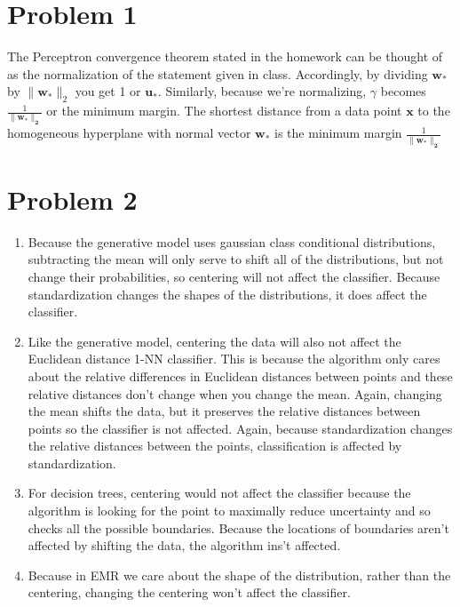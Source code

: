 \documentclass[twoside,11pt]{homework}
\begin{document}
\maketitle

\section*{Problem 1}
The Perceptron convergence theorem stated in the homework can be thought of as the normalization of the statement given in class. Accordingly, by dividing $\bm{w_*}$ by $\|\bm{w_*}\|_2$ you get 1 or $\bm{u_*}$.  Similarly, because we're normalizing, $\gamma$ becomes $\frac{1}{\bm{\|w_*\|_2}}$ or the minimum margin.  The shortest distance from a data point $\bm{x}$ to the homogeneous hyperplane with normal vector $\bm{w_*}$ is the minimum margin $\frac{1}{\bm{\|w_*\|_2}}$

\section*{Problem 2}

\begin{enumerate}[label=\Alph*]
\item Because the generative model uses gaussian class conditional distributions, subtracting the mean will only serve to shift all of the distributions, but not change their probabilities, so centering will not affect the classifier.  Because standardization changes the shapes of the distributions, it does affect the classifier.
\item Like the generative model, centering the data will also not affect the Euclidean distance 1-NN classifier.  This is because the algorithm only cares about the relative differences in Euclidean distances between points and these relative distances don't change when you change the mean.  Again, changing the mean shifts the data, but it preserves the relative distances between points so the classifier is not affected.  Again, because standardization changes the relative distances between the points, classification is affected by standardization.
\item For decision trees, centering would not affect the classifier because the algorithm is looking for the point to maximally reduce uncertainty and so checks all the possible boundaries.  Because the locations of boundaries aren't affected by shifting the data, the algorithm ins't affected.
\item Because in EMR we care about the shape of the distribution, rather than the centering, changing the centering won't affect the classifier.
\end{enumerate}
\end{document}
